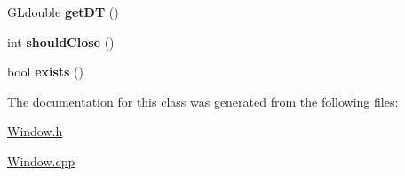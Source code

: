 \begin{DoxyCompactItemize}
\item 
\hypertarget{class_window_a23beb9fd1445d516e8632cf4542525e6}{}G\+Ldouble {\bfseries get\+D\+T} ()\label{class_window_a23beb9fd1445d516e8632cf4542525e6}

\item 
\hypertarget{class_window_a8308cb86163b9fba1c244244980e35a0}{}int {\bfseries should\+Close} ()\label{class_window_a8308cb86163b9fba1c244244980e35a0}

\item 
\hypertarget{class_window_aae1d26349847160eab6ae9e48d4c2cfe}{}bool {\bfseries exists} ()\label{class_window_aae1d26349847160eab6ae9e48d4c2cfe}

\end{DoxyCompactItemize}


The documentation for this class was generated from the following files\+:\begin{DoxyCompactItemize}
\item 
\hyperlink{_window_8h}{Window.\+h}\item 
\hyperlink{_window_8cpp}{Window.\+cpp}\end{DoxyCompactItemize}
